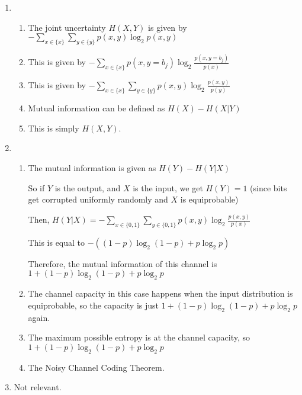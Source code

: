 


\begin{enumerate}[label=(\alph*)]

  \item
    \begin{enumerate}[label=(\roman*)]
      \item
        The joint uncertainty $H(X,Y)$ is given by $-\sum_{x \in \{x\}} \sum_{y \in \{y\}} p(x,y) \log_2 p(x,y)$

      \item
        This is given by $-\sum_{x \in \{x\}} p(x,y=b_j) \log_2 \frac{p(x,y=b_j)}{p(x)}$

      \item
        This is given by $-\sum_{x \in \{x\}} \sum_{y \in \{y\}} p(x,y) \log_2 \frac{p(x,y)}{p(y)}$

      \item
        Mutual information can be defined as $H(X) - H(X|Y)$

      \item
        This is simply $H(X,Y)$.
        
    \end{enumerate}

  \item
    \begin{enumerate}[label=(\roman*)]

      \item
        The mutual information is given as $H(Y) - H(Y|X)$

        So if $Y$ is the output, and $X$ is the input, we get $H(Y) = 1$ (since bits get corrupted uniformly randomly and $X$ is equiprobable)

        Then, $H(Y|X) = -\sum_{x \in \{0,1\}} \sum_{y \in \{0,1\}} p(x,y) \log_2 \frac{p(x,y)}{p(x)}$

        This is equal to $-((1-p)\log_2 (1-p) + p\log_2 p)$

        Therefore, the mutual information of this channel is $1 + (1-p) \log_2 (1-p) + p\log_2 p$

      \item
        The channel capacity in this case happens when the input distribution is equiprobable, so the capacity is just $1 + (1-p) \log_2 (1-p) + p\log_2 p $ again.

      \item
        The maximum possible entropy is at the channel capacity, so $1 + (1-p) \log_2 (1-p) + p\log_2 p$

      \item
        The Noisy Channel Coding Theorem.

        
    \end{enumerate}

  \item
    Not relevant.
        
    \end{enumerate}

